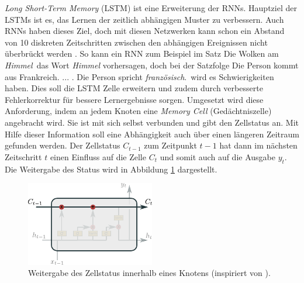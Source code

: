     \textit{Long Short-Term Memory} (LSTM) ist eine Erweiterung der RNNs.
    Hauptziel der LSTMs ist es, das Lernen der zeitlich abhängigen Muster zu verbessern.
    Auch RNNs haben dieses Ziel, doch mit diesen Netzwerken kann schon ein Abstand von 10 diskreten Zeitschritten zwischen den abhängigen Ereignissen nicht überbrückt werden \cite{HOCHREITER1991}. 
    So kann ein RNN zum Beispiel im Satz \glqq Die Wolken am \textit{Himmel}\grqq \ das Wort \textit{Himmel} vorhersagen, doch bei der Satzfolge \glqq Die Person kommt aus Frankreich. ... . Die Person spricht \textit{französisch}.\grqq \ wird es Schwierigkeiten haben.
    Dies soll die LSTM Zelle erweitern und zudem durch verbesserte Fehlerkorrektur für bessere Lernergebnisse sorgen.
    Umgesetzt wird diese Anforderung, indem an jedem Knoten eine \textit{Memory Cell} (Gedächtniszelle) angebracht wird.
    Sie ist mit sich selbst verbunden und gibt den Zellstatus an.
    Mit Hilfe dieser Information soll eine Abhängigkeit auch über einen längeren Zeitraum gefunden werden.
    Der Zellstatus $C_{t-1}$ zum Zeitpunkt $t-1$ hat dann im nächsten Zeitschritt $t$ einen Einfluss auf die Zelle $C_{t}$ und somit auch auf die Ausgabe $y_t$.
    Die Weitergabe des Status wird in Abbildung \ref{fig:LSTM_Status} dargestellt.

    	\begin{figure}[ht]
    		\centering
    		\includegraphics[width=0.5\textwidth]{images/Illustrationen/LSTM_MC}
    		\caption{Weitergabe des Zellstatus innerhalb eines Knotens (inspiriert von \cite{OLAH2015}).}
    		\label{fig:LSTM_Status}
    	\end{figure}
    	
